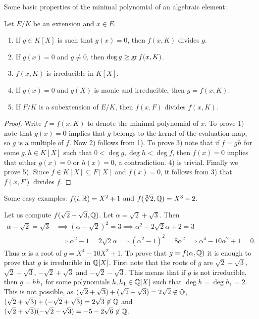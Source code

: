 Some basic properties of the minimal polynomial of an algebraic element:

\begin{proposition}
	Let $E/K$ be an extension and $x\in E$. 
	\begin{enumerate}
		\item If $g\in K[X]$ is such that $g(x)=0$, then $f(x,K)$ divides $g$. 
		\item If $g(x)=0$ and $g\ne 0$, then $\deg g\geq\operatorname{gr} f(x,K)$.
		\item $f(x,K)$ is irreducible in $K[X]$.
		\item If $g(x)=0$ and $g(X)$ is monic and irreducible, then
			$g=f(x,K)$. 
		\item If $F/K$ is a subextension of $E/K$, then $f(x,F)$ divides
			$f(x,K)$. 
	\end{enumerate}
\end{proposition}

\begin{proof}
	Write $f=f(x,K)$ to denote the minimal polynomial of $x$. 
	To prove 1) note that $g(x)=0$ implies that	$g$ belongs to the kernel of
	the evaluation map, so $g$ is a multiple of $f$. Now 2) follows from
	1). To prove 3) note that if $f=gh$ for some $g,h\in K[X]$ such that
	$0<\deg g,\deg h<\deg f$, then $f(x)=0$ implies that 
	either $g(x)=0$ or $h(x)=0$, a
	contradiction. 4) is trivial. Finally we prove 5). Since $f\in K[X]\subseteq F[X]$ 
	and $f(x)=0$, it follows from 3) that $f(x,F)$ divides $f$. 
\end{proof}

Some easy examples: $f(i,\mathbb{R})=X^2+1$ and 
$f(\sqrt[3]{2},\mathbb{Q})=X^3-2$. 

\begin{example}
	Let us compute 
	$f(\sqrt{2}+\sqrt{3},\mathbb{Q})$. Let $\alpha=\sqrt{2}+\sqrt{3}$. 
	Then 
	\begin{align*}
		\alpha-\sqrt{2}=\sqrt{3} & \implies 
		(\alpha-\sqrt{2})^2=3 \implies \alpha^2-2\sqrt{2}\alpha+2=3\\
		&\implies \alpha^2-1=2\sqrt{2}\alpha \implies
		(\alpha^2-1)^2=8\alpha^2\implies
		\alpha^4-10\alpha^2+1=0.
	\end{align*}
	Thus $\alpha$ is a root of $g=X^4-10X^2+1$. To prove that $g=f(\alpha,\mathbb{Q})$ 
	it is enough to prove that 
	$g$ is irreducible in $\mathbb{Q}[X]$. First note that 
	the roots
	of $g$ are $\sqrt{2}+\sqrt{3}$, $\sqrt{2}-\sqrt{3}$, 
	$-\sqrt{2}+\sqrt{3}$ and $-\sqrt{2}-\sqrt{3}$. This means that
	if $g$ is not irreducible, 
	then $g=hh_1$ for some polynomials $h,h_1\in\mathbb{Q}[X]$ such that
	$\deg h=\deg h_1=2$. This is not possible, as 
	$(\sqrt{2}+\sqrt{3})+(\sqrt{2}-\sqrt{3})=2\sqrt{2}\not\in\mathbb{Q}$, 
	$(\sqrt{2}+\sqrt{3})+(-\sqrt{2}+\sqrt{3})=2\sqrt{3}\not\in\mathbb{Q}$ and 
	$(\sqrt{2}+\sqrt{3})(-\sqrt{2}-\sqrt{3})=-5-2\sqrt{6}\not\in\mathbb{Q}$.
\end{example}

